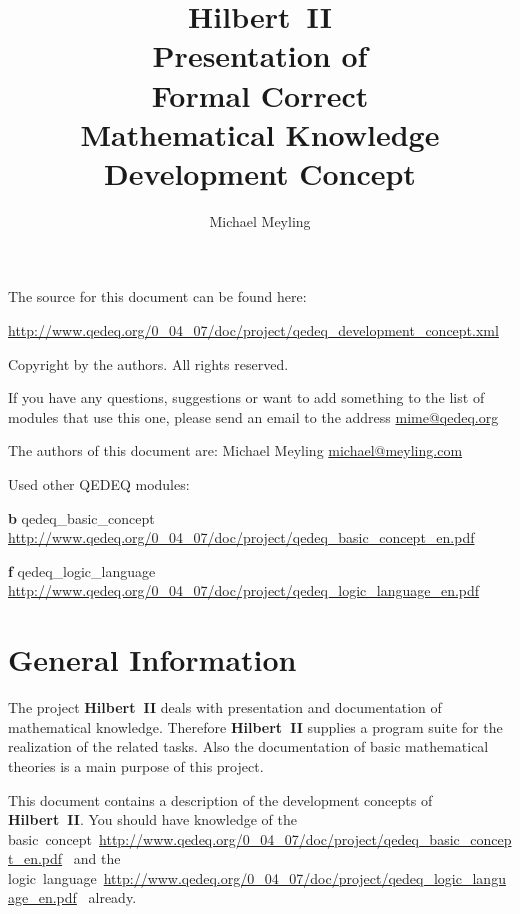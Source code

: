 \documentclass[a4paper,german,10pt,twoside]{book}
\title{\textbf{Hilbert~II} \\
\vspace*{1cm} 
Presentation of \\ 
Formal Correct \\
Mathematical Knowledge \\
\vspace*{1cm} Development Concept}
\author{
Michael Meyling
}
\theoremstyle{definition}
\theoremstyle{remark}
\begin{document}
\maketitle

\setlength{\parskip}{5pt plus 2pt minus 1pt}
\mbox{}
\vfill

\par
The source for this document can be found here:
\par
\url{http://www.qedeq.org/0_04_07/doc/project/qedeq_development_concept.xml}

\par
Copyright by the authors. All rights reserved.
\par
If you have any questions, suggestions or want to add something to the list of modules that use this one, please send an email to the address \href{mailto:mime@qedeq.org}{mime@qedeq.org}

\par
The authors of this document are:
Michael Meyling \href{mailto:michael@meyling.com}{michael@meyling.com}



\par
Used other QEDEQ modules:

\par


\par
\textbf{b} qedeq\_basic\_concept \url{http://www.qedeq.org/0_04_07/doc/project/qedeq_basic_concept_en.pdf}

\par
\textbf{f} qedeq\_logic\_language \url{http://www.qedeq.org/0_04_07/doc/project/qedeq_logic_language_en.pdf}


\setlength{\parskip}{0pt}
\tableofcontents

\setlength{\parskip}{5pt plus 2pt minus 1pt}

\chapter{General Information\label{ch:general}} \label{chapter1} \hypertarget{chapter1}{}

The project \textbf{Hilbert~II} deals with presentation and documentation of mathematical knowledge. Therefore \textbf{Hilbert~II} supplies a program suite for the realization of the related tasks. Also the documentation of basic mathematical theories is a main purpose of this project.
\par
This document contains a description of the development concepts of \textbf{Hilbert~II}.
You should have knowledge of the basic~concept~\url{http://www.qedeq.org/0_04_07/doc/project/qedeq_basic_concept_en.pdf}~\cite{b} and the logic~language~\url{http://www.qedeq.org/0_04_07/doc/project/qedeq_logic_language_en.pdf}~\cite{f} already.
\end{document}

